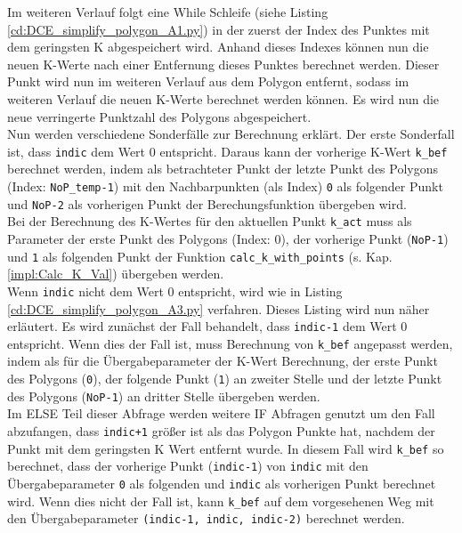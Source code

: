 {	Im weiteren Verlauf folgt eine While Schleife (siehe Listing \ref{cd:DCE_simplify_polygon_A1.py}) in der zuerst der Index des Punktes mit dem geringsten K abgespeichert wird. Anhand dieses Indexes können nun die neuen K-Werte nach einer Entfernung dieses Punktes berechnet werden. Dieser Punkt wird nun im weiteren Verlauf aus dem Polygon entfernt, sodass im weiteren Verlauf die neuen K-Werte berechnet werden können. Es wird nun die neue verringerte Punktzahl des Polygons abgespeichert. \\
	Nun werden verschiedene Sonderfälle zur Berechnung erklärt. Der erste Sonderfall ist, dass \lstinline|indic| dem Wert 0 entspricht. Daraus kann der vorherige K-Wert \lstinline|k_bef| berechnet werden, indem als betrachteter Punkt der letzte Punkt des Polygons (Index: \lstinline|NoP_temp-1|) mit den Nachbarpunkten (als Index) \lstinline|0|  als folgender Punkt und \lstinline|NoP-2| als vorherigen Punkt der Berechungsfunktion übergeben wird. \\
	Bei der Berechnung des K-Wertes für den aktuellen Punkt \lstinline|k_act| muss als Parameter der erste Punkt des Polygons (Index: 0), der vorherige Punkt (\lstinline|NoP-1|) und \lstinline|1| als folgenden Punkt der Funktion \lstinline|calc_k_with_points| (s. Kap. \ref{impl:Calc_K_Val}) übergeben werden. \\

	

	Wenn \lstinline|indic| nicht dem Wert 0 entspricht, wird wie in Listing \ref{cd:DCE_simplify_polygon_A3.py} verfahren. Dieses Listing wird nun näher erläutert.
	Es wird zunächst der Fall behandelt, dass \lstinline|indic-1| dem Wert 0 entspricht. Wenn dies der Fall ist, muss Berechnung von \lstinline|k_bef| angepasst werden, indem als für die Übergabeparameter der K-Wert Berechnung, der erste Punkt des Polygons (\lstinline|0|), der folgende Punkt (\lstinline|1|) an zweiter Stelle und der letzte Punkt des Polygons (\lstinline|NoP-1|) an dritter Stelle übergeben werden. \\
	Im ELSE Teil dieser Abfrage werden weitere IF Abfragen genutzt um den Fall abzufangen, dass \lstinline|indic+1| größer ist als das Polygon Punkte hat, nachdem der Punkt mit dem geringsten K Wert entfernt wurde. In diesem Fall wird \lstinline|k_bef| so berechnet, dass der vorherige Punkt (\lstinline|indic-1|) von \lstinline|indic| mit den Übergabeparameter \lstinline|0| als folgenden und \lstinline|indic| als vorherigen Punkt berechnet wird. Wenn dies nicht der Fall ist, kann \lstinline|k_bef| auf dem vorgesehenen Weg mit den Übergabeparameter \lstinline|(indic-1, indic, indic-2)| berechnet werden. \\

}
